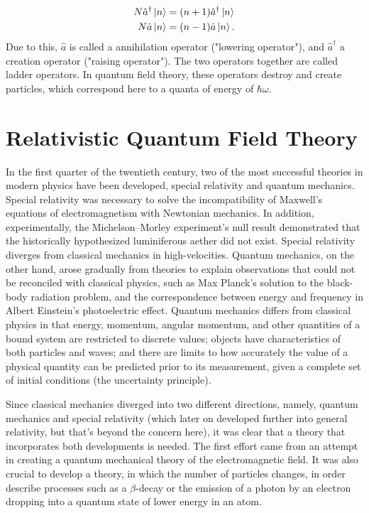 \begin{equation}
\begin{split}
N\hat{a}^\dagger \ket{n} &= (n+1)\hat{a}^\dagger\ket{n} \\
N\hat{a}\ket{n} &= (n-1)\hat{a}\ket{n}.
\end{split}
\end{equation}
Due to this, $\hat{a}$ is called a annihilation operator ("lowering operator"), and $\hat{a}^\dagger$ a creation operator ("raising operator"). The two operators together are called ladder operators. In quantum field theory, these operators destroy and create particles, which correspond here to a quanta of energy of $\hbar\omega$.

\section{Relativistic Quantum Field Theory}

In the first quarter of the twentieth century, two of the most successful theories in modern physics have been developed, special relativity and quantum mechanics. Special relativity was necessary to solve the incompatibility of Maxwell's equations of electromagnetism with Newtonian mechanics. In addition, experimentally,  the Michelson–Morley experiment's null result demonstrated that the historically hypothesized luminiferous aether did not exist. Special relativity diverges from classical mechanics in high-velocities. Quantum mechanics, on the other hand, arose gradually from theories to explain observations that could not be reconciled with classical physics, such as Max Planck's solution to the black-body radiation problem, and the correspondence between energy and frequency in Albert Einstein's photoelectric effect. Quantum mechanics differs from classical physics in that energy, momentum, angular momentum, and other quantities of a bound system are restricted to discrete values; objects have characteristics of both particles and waves; and there are limits to how accurately the value of a physical quantity can be predicted prior to its measurement, given a complete set of initial conditions (the uncertainty principle).

Since classical mechanics diverged into two different directions, namely, quantum mechanics and special relativity (which later on developed further into general relativity, but that's beyond the concern here), it was clear that a theory that incorporates both developments is needed. The first effort came from an attempt in creating a quantum mechanical theory of the electromagnetic field. It was also crucial to develop a theory, in which the number of particles changes, in order describe processes such as a $\beta$-decay or the emission of a photon by an electron dropping into a quantum state of lower energy in an atom.

